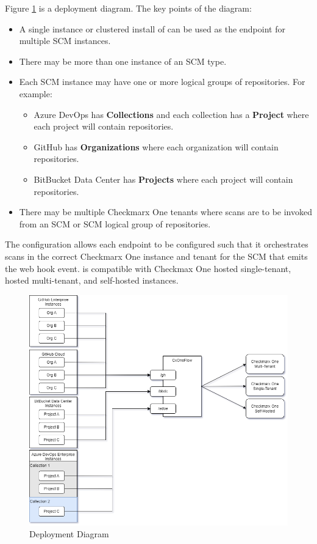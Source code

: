 Figure \ref{fig:cxoneflow-deployment} is a \cxoneflow deployment diagram. The key points of the diagram:

\begin{itemize}
    \item A single instance or clustered install of \cxoneflow can be used as the endpoint for multiple
    SCM instances.
    \item There may be more than one instance of an SCM type.
    \item Each SCM instance may have one or more logical groups of repositories.  For example:
    \begin{itemize}
        \item Azure DevOps has \textbf{Collections} and each collection has a \textbf{Project} where
        each project will contain repositories.
        \item GitHub has \textbf{Organizations} where each organization will contain repositories.
        \item BitBucket Data Center has \textbf{Projects} where each project will contain repositories.
    \end{itemize}
    \item There may be multiple Checkmarx One tenants where scans are to be invoked from an SCM or SCM
    logical group of repositories.
\end{itemize}

The \cxoneflow configuration allows each endpoint to be configured such that it orchestrates
scans in the correct Checkmarx One instance and tenant for the SCM that emits the web hook event.
\cxoneflow is compatible with Checkmax One hosted single-tenant, hosted multi-tenant, and self-hosted
instances.

\begin{figure}[ht]
    \includegraphics[width=\textwidth]{graphics/cxoneflow-deployment.png}
    \caption{\cxoneflow Deployment Diagram}
    \label{fig:cxoneflow-deployment}
\end{figure}

